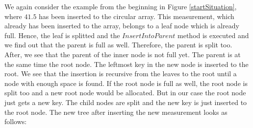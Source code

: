\documentclass[abstracton,12pt,oneside]{scrreprt}
\begin{document}
\begin{exmp}
We again consider the example from the beginning in Figure \ref{startSituation}, where $41.5$ has been inserted to the circular array. This measurement, which already has been inserted to the array, belongs to a leaf node which is already full. Hence, the leaf is splitted and the $InsertIntoParent$ method is executed and we find out that the parent is full as well. Therefore, the parent is split too. After, we see that the parent of the inner node is not full yet. The parent is at the same time the root node. The leftmost key in the new node is inserted to the root. We see that the insertion is recursive from the leaves to the root until a node with enough space is found. If the root node is full as well, the root node is split too and a new root node would be allocated. But in our case the root node just gets a new key. The child nodes are split and the new key is just inserted to the root node. The new tree after inserting the new measurement looks as follows:  
\end{exmp}
\end{document}
